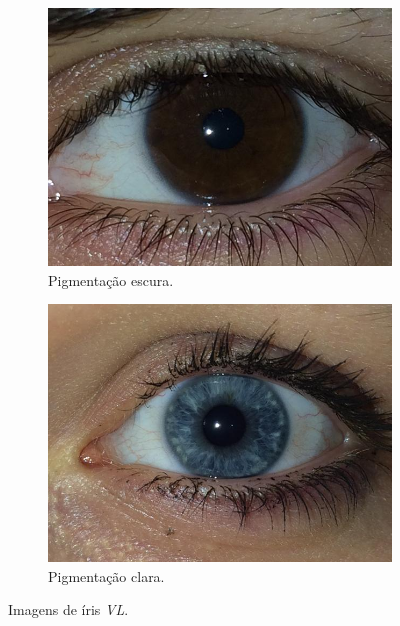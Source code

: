 
\begin{figure}[h!]
\centering
\begin{subfigure}{.5\textwidth}
  \centering
  \includegraphics[width=.5\linewidth]{img/iris_vl_escura}
  \caption{Pigmentação escura.}\label{fig:iris_vl_escura}
\end{subfigure}%
\begin{subfigure}{.5\textwidth}
  \centering
  \includegraphics[width=.5\linewidth]{img/iris_vl_clara}
  \caption{Pigmentação clara.}\label{fig:iris_vl_clara}
\end{subfigure}
\caption{Imagens de íris \textit{\acrshort{VL}}.}
\label{fig:pigmentacoes}
\end{figure}

